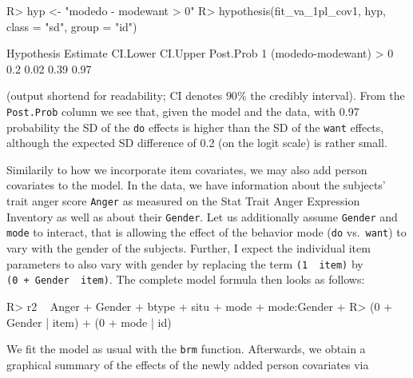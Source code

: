 \documentclass[
]{jss}
\begin{document}
\begin{CodeChunk}

\begin{CodeInput}
R> hyp <- "modedo - modewant > 0"
R> hypothesis(fit_va_1pl_cov1, hyp, class = "sd", group = "id")
\end{CodeInput}
\end{CodeChunk}

\begin{CodeChunk}

\begin{CodeOutput}
             Hypothesis Estimate CI.Lower CI.Upper Post.Prob
1 (modedo-modewant) > 0      0.2     0.02     0.39      0.97
\end{CodeOutput}
\end{CodeChunk}

(output shortend for readability; CI denotes \(90\%\) the credibly
interval). From the \texttt{Post.Prob} column we see that, given the
model and the data, with 0.97 probability the SD of the \texttt{do}
effects is higher than the SD of the \texttt{want} effects, although the
expected SD difference of 0.2 (on the logit scale) is rather small.

Similarily to how we incorporate item covariates, we may also add person
covariates to the model. In the  data, we have information
about the subjects' trait anger score \texttt{Anger} as measured on the
Stat Trait Anger Expression Inventory \citep[STAXI;][]{spielberger2010}
as well as about their \texttt{Gender}. Let us additionally assume
\texttt{Gender} and \texttt{mode} to interact, that is allowing the
effect of the behavior mode (\texttt{do} vs.~\texttt{want}) to vary with
the gender of the subjects. Further, I expect the individual item
parameters to also vary with gender by replacing the term
\texttt{(1\ \textbar{}\ item)} by
\texttt{(0\ +\ Gender\ \textbar{}\ item)}. The complete model formula
then looks as follows:

\begin{CodeChunk}

\begin{CodeInput}
R> r2 ~ Anger + Gender + btype + situ + mode + mode:Gender +
R>   (0 + Gender | item) + (0 + mode | id)
\end{CodeInput}
\end{CodeChunk}

We fit the model as usual with the \texttt{brm} function. Afterwards, we
obtain a graphical summary of the effects of the newly added person
covariates via
\end{document}
